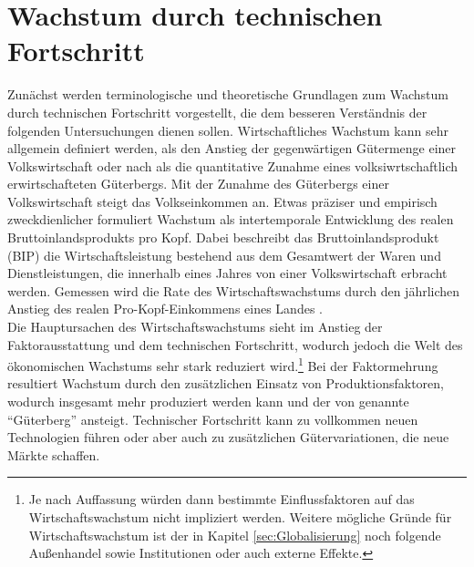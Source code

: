 \chapter[Wachstum durch technischen Fortschritt]{Wachstum durch technischen Fortschritt}\label{Wachstum}
Zun{\"a}chst werden terminologische und theoretische Grundlagen zum Wachstum durch technischen Fortschritt vorgestellt, die dem besseren Verständnis der folgenden Untersuchungen dienen sollen. Wirtschaftliches Wachstum kann sehr allgemein definiert werden, als den Anstieg der gegenwärtigen Gütermenge einer Volkswirtschaft oder nach \citet{Frenkel.1999} als die quantitative Zunahme eines volksiwrtschaftlich erwirtschafteten G{\"u}terbergs. Mit der Zunahme des G{\"u}terbergs einer Volkswirtschaft steigt das Volkseinkommen an. Etwas pr{\"a}ziser und empirisch zweckdienlicher formuliert \citet{Bofinger.2015} Wachstum als intertemporale Entwicklung des realen Bruttoinlandsprodukts pro Kopf. Dabei beschreibt das Bruttoinlandsprodukt (BIP) die Wirtschaftsleistung bestehend aus dem Gesamtwert der Waren und Dienstleistungen, die innerhalb eines Jahres von einer Volkswirtschaft erbracht werden. Gemessen wird die Rate des Wirtschaftswachstums durch den j{\"a}hrlichen Anstieg des realen Pro-Kopf-Einkommens eines Landes \citep{Bofinger.2015}.\\
Die Hauptursachen des Wirtschaftswachstums sieht \citet{Gandolfo.1998} im Anstieg der Faktor\-ausstattung und dem technischen Fortschritt, wodurch jedoch die Welt des {\"o}konomischen Wachstums sehr stark reduziert wird.\footnote{Je nach Auffassung würden dann bestimmte Einflussfaktoren auf das Wirtschaftswachstum nicht impliziert werden. Weitere mögliche Gründe für Wirtschaftswachstum ist der in Kapitel \ref{sec:Globalisierung} noch folgende Au{\ss}enhandel sowie Institutionen oder auch externe Effekte.} Bei der Faktormehrung resultiert Wachstum durch den zusätzlichen Einsatz von Produktionsfaktoren, wodurch insgesamt mehr produziert werden kann und der von \cite{Frenkel.1999} genannte "`Güterberg"' ansteigt. Technischer Fortschritt kann zu vollkommen neuen Technologien führen oder aber auch zu zusätzlichen Gütervariationen, die neue Märkte schaffen.\\


